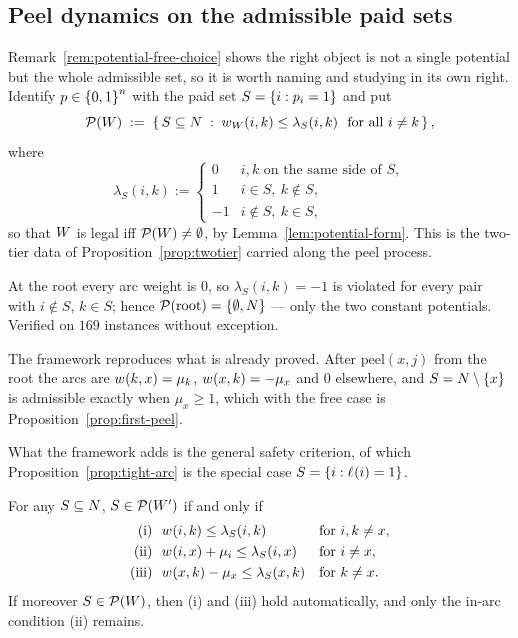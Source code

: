 \subsection{Peel dynamics on the admissible paid sets}
\label{sec:peel-paidsets}

Remark~\ref{rem:potential-free-choice} shows the right object is not a single
potential but the whole admissible set, so it is worth naming and studying in its
own right. Identify $p \in \left\{0,1\right\}^n$ with the paid set
$S = \left\{i : p_i = 1\right\}$ and put
\[
  \mathcal{P}(W) \;:=\;
  \left\{\,S \subseteq N \;:\;
    w_{W}(i,k) \le \lambda_S(i,k) \ \text{ for all } i \ne k\,\right\},
\]
where
\[
  \lambda_S(i,k) :=
  \begin{cases}
    0 & i,k \text{ on the same side of } S,\\
    1 & i \in S,\ k \notin S,\\
    -1 & i \notin S,\ k \in S,
  \end{cases}
\]
so that $W$ is legal iff $\mathcal{P}(W) \ne \emptyset$, by
Lemma~\ref{lem:potential-form}. This is the two-tier data of
Proposition~\ref{prop:twotier} carried along the peel process.

\begin{observation}
\label{obs:paidsets-root}
At the root every arc weight is $0$, so $\lambda_S(i,k) = -1$ is violated for
every pair with $i \notin S$, $k \in S$; hence
$\mathcal{P}(\text{root}) = \left\{\emptyset, N\right\}$ --- only the two constant
potentials. Verified on $169$ instances without exception.
\end{observation}

The framework reproduces what is already proved. After
$\mathrm{peel}(x,j)$ from the root the arcs are $w_{}(k,x) = \mu_k$,
$w_{}(x,k) = -\mu_x$ and $0$ elsewhere, and $S = N \setminus \left\{x\right\}$
is admissible exactly when $\mu_x \ge 1$, which with the free case is
Proposition~\ref{prop:first-peel}.

What the framework adds is the general safety criterion, of which
Proposition~\ref{prop:tight-arc} is the special case $S = \left\{i : \ell_{}(i)=1\right\}$.

\begin{proposition}
\label{prop:inarcs-only}
For any $S \subseteq N$, $S \in \mathcal{P}(W')$ if and only if
\begin{align*}
  \text{(i)}\ \ & w_{}(i,k) \le \lambda_S(i,k)
    && \text{for } i,k \ne x, \\
  \text{(ii)}\ \ & w_{}(i,x) + \mu_i \le \lambda_S(i,x)
    && \text{for } i \ne x, \\
  \text{(iii)}\ \ & w_{}(x,k) - \mu_x \le \lambda_S(x,k)
    && \text{for } k \ne x .
\end{align*}
If moreover $S \in \mathcal{P}(W)$, then (i) and (iii) hold
automatically, and only the in-arc condition (ii) remains.
\end{proposition}

